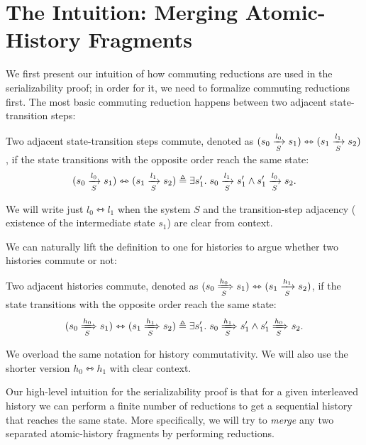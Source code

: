 \section{The Intuition: Merging Atomic-History Fragments}
\label{sec-sz-pf-intuition}

\newcommand{\commstep}[2]{\ensuremath{#1 \leftrightarrowtriangle #2}}
\newcommand{\commhst}[2]{\ensuremath{#1 \leftrightarrowtriangle #2}}

We first present our intuition of how commuting reductions are used in the serializability proof; in order for it, we need to formalize commuting reductions first.
The most basic commuting reduction happens between two adjacent state-transition steps:
\begin{definition}
  \label{def-comm-steps}
  Two adjacent state-transition steps commute, denoted as \commstep{(\semstep{S}{s_0}{l_0}{s_1})}{(\semstep{S}{s_1}{l_1}{s_2})}, if the state transitions with the opposite order reach the same state:
  \begin{displaymath}
    \commstep{(\semstep{S}{s_0}{l_0}{s_1})}{(\semstep{S}{s_1}{l_1}{s_2})} \triangleq \exists s_1'.\; \semstep{S}{s_0}{l_1}{s_1'} \wedge \semstep{S}{s_1'}{l_0}{s_2}.
  \end{displaymath}
\end{definition}
We will write just $\commstep{l_0}{l_1}$ when the system $S$ and the transition-step adjacency (\ie{} existence of the intermediate state $s_1$) are clear from context.

We can naturally lift the definition to one for histories to argue whether two histories commute or not:
\begin{definition}
  \label{def-comm-hsts}
  Two adjacent histories commute, denoted as \commstep{(\semsteps{S}{s_0}{h_0}{s_1})}{(\semstep{S}{s_1}{h_1}{s_2})}, if the state transitions with the opposite order reach the same state:
  \begin{displaymath}
    \commhst{(\semsteps{S}{s_0}{h_0}{s_1})}{(\semsteps{S}{s_1}{h_1}{s_2})} \triangleq \exists s_1'.\; \semsteps{S}{s_0}{h_1}{s_1'} \wedge \semsteps{S}{s_1'}{h_0}{s_2}.
  \end{displaymath}
\end{definition}
We overload the same notation for history commutativity.
We will also use the shorter version $\commhst{h_0}{h_1}$ with clear context.

Our high-level intuition for the serializability proof is that for a given interleaved history we can perform a finite number of reductions to get a sequential history that reaches the same state.
More specifically, we will try to \emph{merge} any two separated atomic-history fragments by performing reductions.


